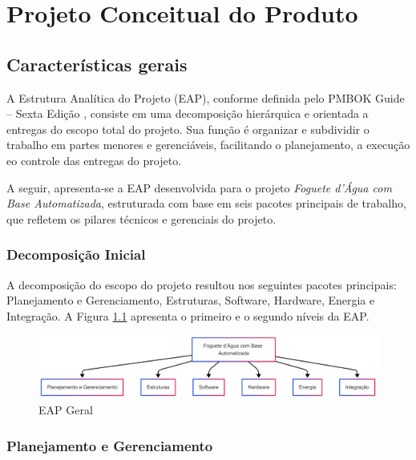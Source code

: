\usepackage{tikz} %

\chapter{Projeto Conceitual do Produto}

\section{Características gerais}

A Estrutura Analítica do Projeto (EAP), conforme definida pelo PMBOK Guide – Sexta Edição \cite{pmbok2017}, consiste em uma decomposição hierárquica e orientada a entregas do escopo total do projeto. Sua função é organizar e subdividir o trabalho em partes menores e gerenciáveis, facilitando o planejamento, a execução eo controle das entregas do projeto.

A seguir, apresenta-se a EAP desenvolvida para o projeto \textit{Foguete d’Água com Base Automatizada}, estruturada com base em seis pacotes principais de trabalho, que refletem os pilares técnicos e gerenciais do projeto.

\subsection{Decomposição Inicial}

A decomposição do escopo do projeto resultou nos seguintes pacotes principais: Planejamento e Gerenciamento, Estruturas, Software, Hardware, Energia e Integração. A Figura \ref{fig_eap_unificado} apresenta o primeiro e o segundo níveis da EAP.

\begin{figure}[!h]
	\centering
\includegraphics[width=15cm]{figuras/eap_unificado.png}
	\caption{EAP Geral}
	\label{fig_eap_unificado} 
\end{figure}


\subsection{Planejamento e Gerenciamento}

